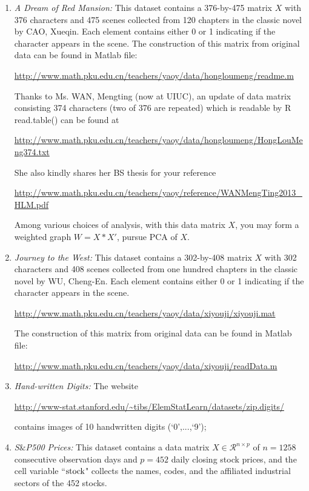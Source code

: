 \documentclass[11pt]{article}
\def\R{{\mathcal R}}
\begin{document}
\begin{enumerate}

\item {\em A Dream of Red Mansion:} This dataset contains a 376-by-475 matrix $X$ with 376 characters and 475 scenes collected from 120 chapters in
the classic novel by CAO, Xueqin. Each element contains either 0 or 1 indicating if the character appears in the scene.  The construction of this matrix from original data can be found in Matlab file: 

\url{http://www.math.pku.edu.cn/teachers/yaoy/data/hongloumeng/readme.m}

Thanks to Ms. WAN, Mengting (now at UIUC), an update of data matrix consisting 374 characters (two of 376 are repeated) which is readable by R read.table() can be found at 

\url{http://www.math.pku.edu.cn/teachers/yaoy/data/hongloumeng/HongLouMeng374.txt}

\noindent She also kindly shares her BS thesis for your reference
 
 \url{http://www.math.pku.edu.cn/teachers/yaoy/reference/WANMengTing2013_HLM.pdf}

Among various choices of analysis, with this data matrix $X$, you may form a weighted graph $W=X * X'$, pursue PCA of $X$. 

\item {\em Journey to the West:} This dataset contains a 302-by-408 matrix $X$ with 302 characters and 408 scenes collected from one hundred chapters in
the classic novel by WU, Cheng-En. Each element contains either 0 or 1 indicating if the character appears in the scene. 

\url{http://www.math.pku.edu.cn/teachers/yaoy/data/xiyouji/xiyouji.mat} 

The construction of this matrix from original data can be found in Matlab file: 

\url{http://www.math.pku.edu.cn/teachers/yaoy/data/xiyouji/readData.m}

\item {\em Hand-written Digits:} The website 

\url{http://www-stat.stanford.edu/\~tibs/ElemStatLearn/datasets/zip.digits/}

contains images of 10 handwritten digits (`$0$',...,`9');

\item {\em S$\&$P500 Prices:} This dataset contains a data matrix $X\in \R^{n\times p}$ of $n=1258$ consecutive observation days and $p=452$ daily closing stock prices, and the cell variable ``${\rm stock}$" collects the names, codes, and the affiliated industrial sectors of the 452 stocks.


\end{enumerate}
\end{document}
